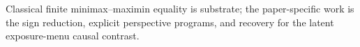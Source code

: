Classical finite minimax--maximin equality is substrate; the paper-specific work is the sign reduction, explicit perspective programs, and recovery for the latent exposure-menu causal contrast.